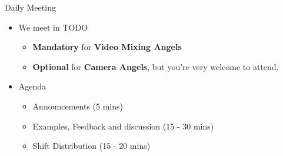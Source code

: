 
\begin{frame}{Daily Meeting}
	\begin{itemize}
		\item We meet in TODO
		\begin{itemize}
			\item \textbf{Mandatory} for \textbf{Video Mixing Angels}
			\item \textbf{Optional} for \textbf{Camera Angels}, but you're very welcome to attend.
		\end{itemize}
		\item Agenda
		\begin{itemize}
			\item Announcements (5 mins)
			\item Examples, Feedback and discussion (15 - 30 mins)
			\item Shift Distribution (15 - 20 mins)
		\end{itemize}
	\end{itemize}
\end{frame}
